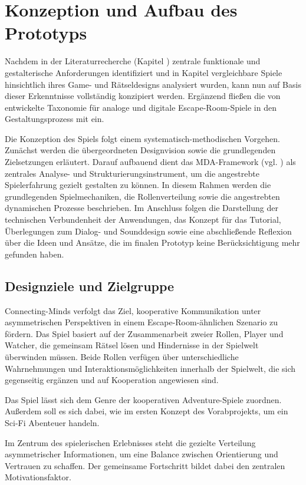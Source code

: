\chapter{Konzeption und Aufbau des Prototyps}\label{sec:concept}
Nachdem in der Literaturrecherche (Kapitel \textit{}) zentrale funktionale und gestalterische Anforderungen identifiziert und in Kapitel \textit{} vergleichbare Spiele hinsichtlich ihres Game- und Rätseldesigns analysiert wurden, kann  nun auf Basis dieser Erkenntnisse vollständig konzipiert werden. Ergänzend fließen die von \cite{krekhov_puzzles_2021} entwickelte Taxonomie für analoge und digitale Escape-Room-Spiele in den Gestaltungsprozess mit ein.

Die Konzeption des Spiels folgt einem systematisch-methodischen Vorgehen. Zunächst werden die übergeordneten Designvision sowie die grundlegenden Zielsetzungen erläutert. Darauf aufbauend dient das \ac{MDA}-Framework (vgl. \citealp{hunicke_mda_2004}) als zentrales Analyse- und Strukturierungsinstrument, um die angestrebte Spielerfahrung gezielt gestalten zu können. In diesem Rahmen werden die grundlegenden Spielmechaniken, die Rollenverteilung sowie die angestrebten dynamischen Prozesse beschrieben. Im Anschluss folgen die Darstellung der technischen Verbundenheit der Anwendungen, das Konzept für das Tutorial, Überlegungen zum Dialog- und Sounddesign sowie eine abschließende Reflexion über die Ideen und Ansätze, die im finalen Prototyp keine Berücksichtigung mehr gefunden haben.

\section{Designziele und Zielgruppe}
Connecting-Minds verfolgt das Ziel, kooperative Kommunikation unter asymmetrischen Perspektiven in einem Escape-Room-ähnlichen Szenario zu fördern. Das Spiel basiert auf der Zusammenarbeit zweier Rollen, Player und Watcher, die gemeinsam Rätsel lösen und Hindernisse in der Spielwelt überwinden müssen. Beide Rollen verfügen über unterschiedliche Wahrnehmungen und Interaktionsmöglichkeiten innerhalb der Spielwelt, die sich gegenseitig ergänzen und auf Kooperation angewiesen sind.

Das Spiel lässt sich dem Genre der kooperativen Adventure-Spiele zuordnen. Außerdem soll es sich dabei, wie im ersten Konzept des Vorabprojekts, um ein \ac{Sci-Fi} Abenteuer handeln.

Im Zentrum des spielerischen Erlebnisses steht die gezielte Verteilung asymmetrischer Informationen, um eine Balance zwischen Orientierung und Vertrauen zu schaffen. Der gemeinsame Fortschritt bildet dabei den zentralen Motivationsfaktor.

